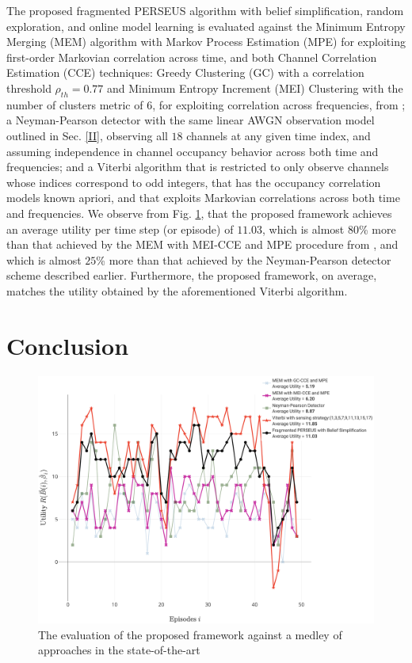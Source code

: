 \documentclass[10pt,twocolumn]{IEEEtran}
\begin{document}
The proposed fragmented PERSEUS algorithm with belief simplification, random exploration, and online model learning is evaluated against the Minimum Entropy Merging (MEM) algorithm with Markov Process Estimation (MPE) for exploiting first-order Markovian correlation across time, and both Channel Correlation Estimation (CCE) techniques: Greedy Clustering (GC) with a correlation threshold $\rho_{th}{=}0.77$ and Minimum Entropy Increment (MEI) Clustering with the number of clusters metric of $6$, for exploiting correlation across frequencies, from \cite{6956794}; a Neyman-Pearson detector with the same linear AWGN observation model outlined in Sec. \ref{II}, observing all $18$ channels at any given time index, and assuming independence in channel occupancy behavior across both time and frequencies; and a Viterbi algorithm that is restricted to only observe channels whose indices correspond to odd integers, that has the occupancy correlation models known apriori, and that exploits Markovian correlations across both time and frequencies. We observe from Fig. \ref{fig:7}, that the proposed framework achieves an average utility per time step (or episode) of $11.03$, which is almost $80$\% more than that achieved by the MEM with MEI-CCE and MPE procedure from \cite{6956794}, and which is almost $25$\% more than that achieved by the Neyman-Pearson detector scheme described earlier. Furthermore, the proposed framework, on average, matches the utility obtained by the aforementioned Viterbi algorithm. 
\section{Conclusion}\label{V}
\begin{figure}
    \centering
    \includegraphics[width=1.0\linewidth]{PerformanceEvaluation.png}
    \caption{The evaluation of the proposed framework against a medley of approaches in the state-of-the-art}
    \label{fig:7}
\end{figure}
\end{document}
